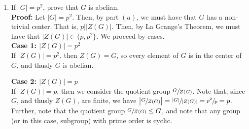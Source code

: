 \documentclass{article}
\begin{document}
\begin{enumerate}
\begin{enumerate}
\begin{align*}
        \end{align*}
        Now, since $C_G(x) < G$, by La Grange's Theorem, we have that $|C_G(x)| \big| |G|$, so 
        \[
            p^n = |Z(G)| + \sum{\dfrac{p^n}{|C_G(x)|}} \Longrightarrow p^n = |Z(G)| + \sum{\dfrac{p^n}{p^{l_x}}}
        \]
        with $0 \leq l_x < n$. Then we have 
        \begin{align*}
            p^n = |Z(G)| + \sum{\dfrac{p^n}{p^{l_x}}} &\Longrightarrow p^n = |Z(G)| + \sum{p^{n-l_x}}\\
            &\Longrightarrow p^n-p^{n-l_x} = |Z(G)| \\
            &\Longrightarrow p(p^{n-1}-p^{n-l_x-1}) = |Z(G)| \\
            &\Longrightarrow p \big| |Z(G)| \\
            &\Longrightarrow Z(G) \neq \{e\}. \ \square
        \end{align*}
        \item If $|G|=p^2$, prove that $G$ is abelian.\\
        \textbf{Proof:} Let $|G| = p^2$. Then, by part $(a)$, we must have that $G$ has a non-trivial center. That is, $p \big| |Z(G)|$. Then, 
        by La Grange's Theorem, we must have that $|Z(G)| \in \{p,p^2\}$. We proceed by cases.\\
        \textbf{Case 1: $|Z(G)| = p^2$} \\
        If $|Z(G)| = p^2$, then $Z(G) = G$, so every element of $G$ is in the center of $G$, and thusly $G$ is abelian.

        \textbf{Case 2: $|Z(G)| = p$} \\
        If $|Z(G)| = p$, then we consider the quotient group $\sfrac{G}{Z(G)}$. Note that, since $G$, and thusly $Z(G)$, are finite, we have 
        $\big| \sfrac{G}{Z(G)} \big| = \sfrac{|G|}{|Z(G)|} = \sfrac{p^2}{p} = p$. Further, note that the quotient group $\sfrac{G}{Z(G)} \leq G$, 
        and note that any group (or in this case, subgroup) with prime order is cyclic. 


\end{enumerate}
\end{enumerate}
\end{document}
